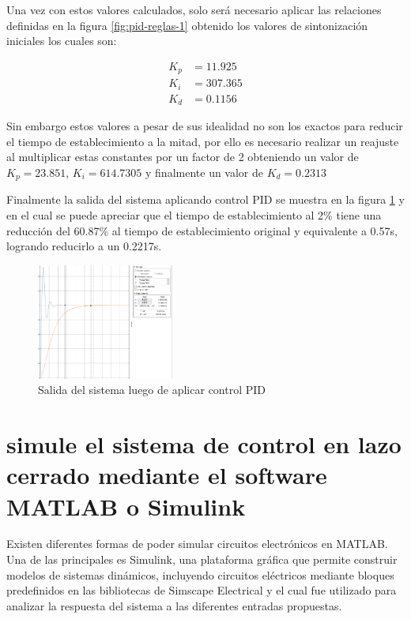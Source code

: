 \documentclass[conference]{IEEEtran}
\begin{document}
	Una vez con estos valores calculados, solo será necesario aplicar las relaciones definidas en la figura \ref{fig:pid-reglas-1} obtenido los valores de sintonización iniciales los cuales son:
	
	\begin{align}
		K_p &= 11.925 \\
		K_i &= 307.365 \\
		K_d &= 0.1156
	\end{align}
	
	Sin embargo estos valores a pesar de sus idealidad no son los exactos para reducir el tiempo de establecimiento a la mitad, por ello es necesario realizar un reajuste al multiplicar estas constantes por un factor de 2 obteniendo un valor de $K_p = 23.851$, $K_i = 614.7305$ y finalmente un valor de $K_d = 0.2313$
	
	Finalmente la salida del sistema aplicando control PID se muestra en la figura \ref{fig:sobreamortiguado-pid} y en el cual se puede apreciar que el tiempo de establecimiento al 2\% tiene una reducción del 60.87\% al tiempo de establecimiento original y equivalente a 0.57s, logrando reducirlo a un 0.2217s.
	
	\begin{figure}[h]
		\centering
		\includegraphics[width=0.4\textwidth]{media1/sobreamortiguado-pid}
		\caption{Salida del sistema luego de aplicar control PID}
		\label{fig:sobreamortiguado-pid}
	\end{figure}
	
	
	\section{simule el sistema de control en lazo cerrado mediante el software MATLAB o Simulink}
	
	Existen diferentes formas de poder simular circuitos electrónicos en MATLAB. Una de las principales es Simulink, una plataforma gráfica que permite construir modelos de sistemas dinámicos, incluyendo circuitos eléctricos mediante bloques predefinidos en las bibliotecas de Simscape Electrical y el cual fue utilizado para analizar la respuesta del sistema a las diferentes entradas propuestas.
	
\end{document}

